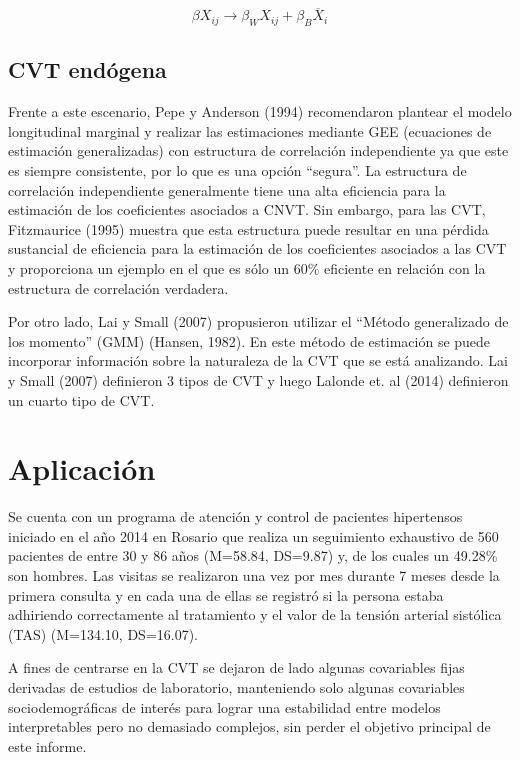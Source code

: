 \documentclass[spanish]{article}
\numberwithin{figure}{subsection}
\numberwithin{equation}{subsection}
\numberwithin{table}{subsection}
\def\npatients{560}
\begin{document}
\[
	\beta X_{ij} \rightarrow \beta_W X_{ij} + \beta_B \overline{X}_i
\]

\subsection{CVT endógena}

Frente a este escenario, Pepe y Anderson (1994) recomendaron plantear el modelo
longitudinal marginal y realizar las estimaciones mediante GEE (ecuaciones de
estimación generalizadas) con estructura de correlación independiente ya que
este es siempre consistente, por lo que es una opción ``segura''. La estructura
de correlación independiente generalmente tiene una alta eficiencia para la
estimación de los coeficientes asociados a CNVT. Sin embargo, para las CVT,
Fitzmaurice (1995) muestra que esta estructura puede resultar en una pérdida
sustancial de eficiencia para la estimación de los coeficientes asociados a las
CVT y proporciona un ejemplo en el que es sólo un 60\% eficiente en relación con
la estructura de correlación verdadera.

Por otro lado, Lai y Small (2007) propusieron utilizar el ``Método generalizado
de los momento'' (GMM) (Hansen, 1982). En este método de estimación se puede
incorporar información sobre la naturaleza de la CVT que se está analizando. Lai
y Small (2007) definieron 3 tipos de CVT y luego Lalonde et. al (2014)
definieron un cuarto tipo de CVT.

\newpage

\section{Aplicación}

Se cuenta con un programa de atención y control de pacientes hipertensos
iniciado en el año 2014 en Rosario que realiza un seguimiento exhaustivo de
\npatients{} pacientes de entre 30 y 86 años (M=58.84, DS=9.87) y, de los
cuales un 49.28\% son hombres. Las visitas se realizaron una vez por mes
durante 7 meses desde la primera consulta y en cada una de ellas se registró si
la persona estaba adhiriendo correctamente al tratamiento y el valor de la
tensión arterial sistólica (TAS) (M=134.10, DS=16.07).

A fines de centrarse en la CVT se dejaron de lado algunas covariables fijas
derivadas de estudios de laboratorio, manteniendo solo algunas covariables
sociodemográficas de interés para lograr una estabilidad entre modelos
interpretables pero no demasiado complejos, sin perder el objetivo principal de
este informe.
\end{document}
